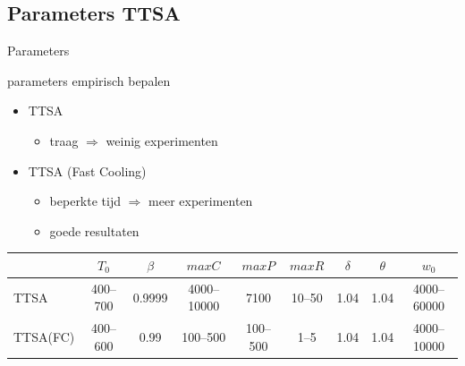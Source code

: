 \documentclass{beamer}
\begin{document}

% 

\subsection*{Parameters TTSA}
\begin{frame}{Parameters}

parameters \alert{empirisch} bepalen

\begin{itemize}
\item TTSA
\begin{itemize}
 \item traag $\Rightarrow$ \alert{weinig experimenten}
\end{itemize}

\item TTSA (Fast Cooling)
\begin{itemize}
\item beperkte tijd $\Rightarrow$ meer experimenten
\item goede resultaten
\end{itemize}
\end{itemize}

\tiny{
\begin{tabular}{l c c c c c c c c} \toprule
& $T_0$ & $\beta$ & $maxC$ & $maxP$ & $maxR$ & $\delta$ & $\theta$ & $w_0$ \\\midrule
TTSA &  400--700 & 0.9999 & 4000--10000 & 7100 & 10--50 & 1.04 & 1.04 & 4000--60000 \\ 
TTSA(FC) &  400--600 & 0.99 & 100--500 & 100--500 & 1--5 & 1.04 & 1.04 & 4000--10000 \\\bottomrule

\end{tabular}}

\end{frame}


\end{document}
